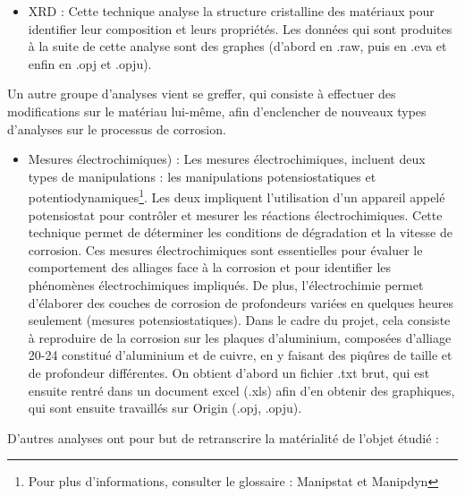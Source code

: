 \begin{itemize}
    \item \gls{XRD} : Cette technique analyse la structure cristalline des matériaux pour identifier leur composition et leurs propriétés. Les données qui sont produites à la suite de cette analyse sont des graphes (d’abord en .raw, puis en .eva et enfin en .opj et .opju).\\
\end{itemize}

Un autre groupe d’analyses vient se greffer, qui consiste à effectuer des modifications sur le matériau lui-même, afin d’enclencher de nouveaux types d’analyses sur le processus de corrosion.\\

\begin{itemize}
    \item Mesures électrochimiques) : Les mesures électrochimiques, incluent deux types de manipulations : les manipulations potensiostatiques et potentiodynamiques\footnote{Pour plus d'informations, consulter le glossaire : \gls{Manipstat} et \gls{Manipdyn}}. Les deux impliquent l'utilisation d'un appareil appelé potensiostat pour contrôler et mesurer les réactions électrochimiques. Cette technique permet de déterminer les conditions de dégradation et la vitesse de corrosion. Ces mesures électrochimiques sont essentielles pour évaluer le comportement des alliages face à la corrosion et pour identifier les phénomènes électrochimiques impliqués. De plus, l'électrochimie permet d'élaborer des couches de corrosion de profondeurs variées en quelques heures seulement (mesures potensiostatiques). Dans le cadre du projet, cela consiste à reproduire de la corrosion sur les plaques d'aluminium, composées d’alliage 20-24 constitué d'aluminium et de cuivre, en y faisant des piqûres de taille et de profondeur différentes. On obtient d’abord un fichier .txt brut, qui est ensuite rentré dans un document excel (.xls) afin d’en obtenir des graphiques, qui sont ensuite travaillés sur Origin (.opj, .opju).\\
\end{itemize}

D’autres analyses ont pour but de retranscrire la matérialité de l’objet étudié :\\

